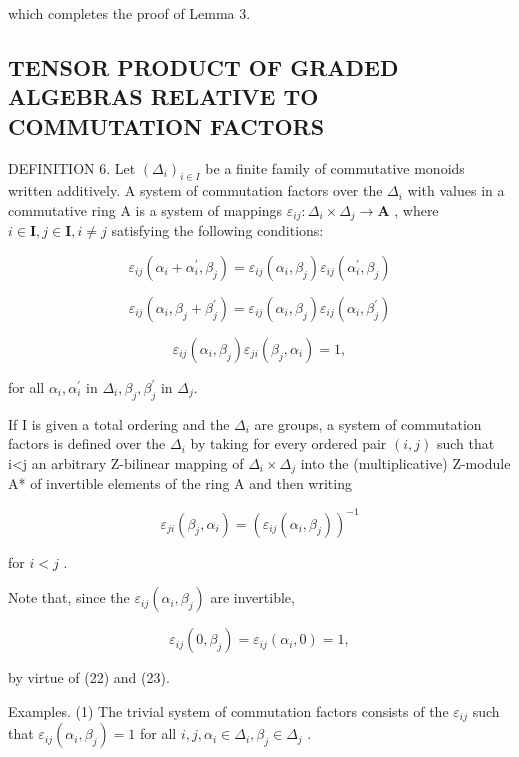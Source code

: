 which completes the proof of Lemma 3.

\subsection{TENSOR PRODUCT OF GRADED ALGEBRAS RELATIVE TO COMMUTATION FACTORS}

DEFINITION 6. Let \((\Delta_{i})_{i\in I}\) be a finite family of commutative monoids written additively. A system of commutation factors over the \(\Delta_{i}\) with values in a commutative ring A is a system of mappings \(\varepsilon_{ij}:\Delta_i\times \Delta_j\to \mathbf{A}\) , where \(i\in \mathbf{I}, j\in \mathbf{I}, i\neq j\) satisfying the following conditions:

\[
\varepsilon_ {i j} \left(\alpha_ {i} + \alpha_ {i} ^ {\prime}, \beta_ {j}\right) = \varepsilon_ {i j} \left(\alpha_ {i}, \beta_ {j}\right) \varepsilon_ {i j} \left(\alpha_ {i} ^ {\prime}, \beta_ {j}\right)\tag{22}
\]

\[
\varepsilon_ {i j} \left(\alpha_ {i}, \beta_ {j} + \beta_ {j} ^ {\prime}\right) = \varepsilon_ {i j} \left(\alpha_ {i}, \beta_ {j}\right) \varepsilon_ {i j} \left(\alpha_ {i}, \beta_ {j} ^ {\prime}\right)\tag{23}
\]

\[
\varepsilon_ {i j} (\alpha_ {i}, \beta_ {j}) \varepsilon_ {j i} (\beta_ {j}, \alpha_ {i}) = 1,\tag{24}
\]

for all \(\alpha_{i},\alpha_{i}^{\prime}\) in \(\Delta_{i},\beta_{j},\beta_{j}^{\prime}\) in \(\Delta_j\).

If I is given a total ordering and the \(\Delta_{i}\) are groups, a system of commutation factors is defined over the \(\Delta_{i}\) by taking for every ordered pair \((i,j)\) such that i\textless j an arbitrary Z-bilinear mapping of \(\Delta_{i}\times\Delta_{j}\) into the (multiplicative) Z-module A* of invertible elements of the ring A and then writing

\[
\varepsilon_ {j i} (\beta_ {j}, \alpha_ {i}) = (\varepsilon_ {i j} (\alpha_ {i}, \beta_ {j})) ^ {- 1}
\]

for \(i < j\) .

Note that, since the \(\varepsilon_{ij}(\alpha_{i},\beta_{j})\) are invertible,

\[
\varepsilon_ {i j} (0, \beta_ {j}) = \varepsilon_ {i j} (\alpha_ {i}, 0) = 1,
\]

by virtue of (22) and (23).

Examples. (1) The trivial system of commutation factors consists of the \(\varepsilon_{ij}\) such that \(\varepsilon_{ij}(\alpha_i, \beta_j) = 1\) for all \(i, j, \alpha_i \in \Delta_i, \beta_j \in \Delta_j\) .

